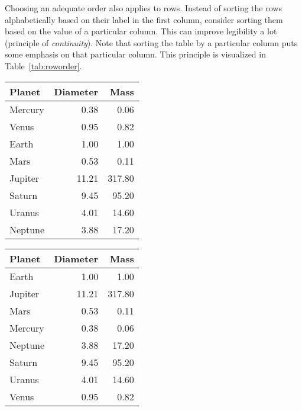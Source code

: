 Choosing an adequate order also applies to rows. Instead of sorting the rows alphabetically based on their label in the first column, consider sorting them based on the value of a particular column. This can improve legibility a lot (principle of \emph{continuity}). Note that sorting the table by a particular column puts some emphasis on that particular column. This principle is visualized in Table~\ref{tab:roworder}.

\begin{table*}[tb]
  \caption{\label{tab:roworder} Listing planets in order from the sun, in alphabetical order, and in descending order of diameter (reproduced from \cite{Carter12} with permission).}
  \centering
  \footnotesize %
  {\renewcommand{\arraystretch}{1.1} %
  \begin{tabularx}{0.3\linewidth}{@{}Xrr@{}} %
    \toprule
    Planet & Diameter & Mass \\
    \midrule
    Mercury & 0.38 & 0.06 \\
    Venus & 0.95 & 0.82 \\
    Earth & 1.00 & 1.00 \\
    Mars & 0.53 & 0.11 \\
    Jupiter & 11.21 & 317.80 \\
    Saturn & 9.45 & 95.20 \\
    Uranus & 4.01 & 14.60 \\
    Neptune & 3.88 & 17.20 \\
    \bottomrule
  \end{tabularx}
  \hspace{\fill}
  \begin{tabularx}{0.3\linewidth}{@{}Xrr@{}} %
    \toprule
    Planet & Diameter & Mass \\
    \midrule
    Earth & 1.00 & 1.00 \\
    Jupiter & 11.21 & 317.80 \\
    Mars & 0.53 & 0.11 \\
    Mercury & 0.38 & 0.06 \\
    Neptune & 3.88 & 17.20 \\
    Saturn & 9.45 & 95.20 \\
    Uranus & 4.01 & 14.60 \\
    Venus & 0.95 & 0.82 \\

\end{tabularx}}
\end{table*}
